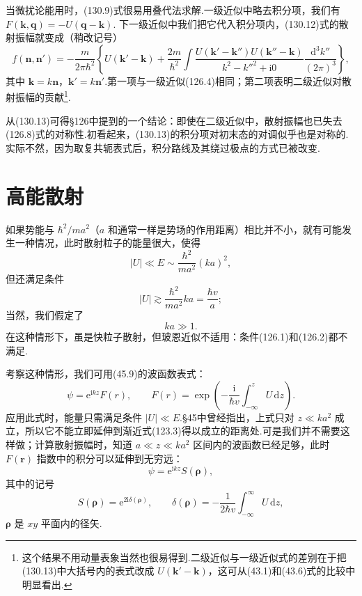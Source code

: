 当微扰论能用时，(130.9)式很易用叠代法求解.一级近似中略去积分项，我们有
$F(\boldsymbol{k},\boldsymbol{q})=-U(\boldsymbol{q}-\boldsymbol{k})$.
下一级近似中我们把它代入积分项内，(130.12)式的散射振幅就变成（稍改记号）
\begin{equation}
  f(\boldsymbol{n},\boldsymbol{n}')
  =-\frac{m}{2\pi\hbar^2}\left\{U(\boldsymbol{k}'-\boldsymbol{k})
  +\frac{2m}{\hbar^2}\int
  \frac{U(\boldsymbol{k}'-\boldsymbol{k}'')U(\boldsymbol{k}''-\boldsymbol{k})}
  {k^2-k''^2+\mathrm{i}0}
  \frac{\mathrm{d}^3k''}{(2\pi)^3}\right\},
\end{equation}
其中 $\boldsymbol{k}=k\boldsymbol{n}$，$\boldsymbol{k}'=k\boldsymbol{n}'$.第一项与一级近似(126.4)相同；第二项表明二级近似对散射振幅的贡献\footnote{这个结果不用动量表象当然也很易得到.二级近似与一级近似式的差别在于把(130.13)中大括号内的表式改成 $U(\boldsymbol{k}'-\boldsymbol{k})$，这可从(43.1)和(43.6)式的比较中明显看出.}.

从(130.13)可得§126中提到的一个结论：即使在二级近似中，散射振幅也已失去(126.8)式的对称性.初看起来，(130.13)的积分项对初末态的对调似乎也是对称的.实际不然，因为取复共轭表式后，积分路线及其绕过极点的方式已被改变.

\section{高能散射}

如果势能与 $\hbar^2/ma^2$（$a$ 和通常一样是势场的作用距离）相比并不小，就有可能发生一种情况，此时散射粒子的能量很大，使得
\begin{equation}
  |U|\ll E\sim\frac{\hbar^2}{ma^2}(ka)^2,
\end{equation}
但还满足条件
\begin{equation}
  |U|\gtrsim\frac{\hbar^2}{ma^2}ka=\frac{\hbar v}{a};
\end{equation}
当然，我们假定了
\begin{equation}
  ka\gg1.
\end{equation}
在这种情形下，虽是快粒子散射，但玻恩近似不适用：条件(126.1)和(126.2)都不满足.

考察这种情形，我们可用(45.9)的波函数表式：
\begin{equation}
  \psi=\mathrm{e}^{\mathrm{i}kz}F(r),\qquad
  F(r)=\exp\left(-\frac{\mathrm{i}}{\hbar v}\int_{-\infty}^{z}U\,\mathrm{d}z\right).
\end{equation}
应用此式时，能量只需满足条件 $|U|\ll E$.§45中曾经指出，上式只对 $z\ll ka^2$ 成立，所以它不能立即延伸到渐近式(123.3)得以成立的距离处.可是我们并不需要这样做；计算散射振幅时，知道 $a\ll z\ll ka^2$ 区间内的波函数已经足够，此时 $F(\boldsymbol{r})$ 指数中的积分可以延伸到无穷远：
\begin{equation}
  \psi=\mathrm{e}^{\mathrm{i}kz}S(\boldsymbol{\rho}),
\end{equation}
其中的记号
\begin{equation}
  S(\boldsymbol{\rho})=\mathrm{e}^{2\mathrm{i}\delta(\boldsymbol{\rho})},
  \qquad
  \delta(\boldsymbol{\rho})=-\frac{1}{2\hbar v}
  \int_{-\infty}^{\infty}U\,\mathrm{d}z,
\end{equation}
$\boldsymbol{\rho}$ 是 $xy$ 平面内的径矢.

